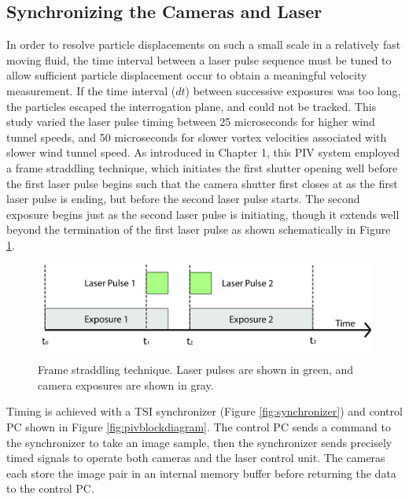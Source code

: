 \subsection{Synchronizing the Cameras and Laser}
In order to resolve particle displacements on such a small scale in a 
relatively fast moving fluid, the time interval between a laser pulse sequence 
must be tuned to allow sufficient particle displacement occur to obtain a 
meaningful velocity measurement. If the time interval ($dt$) between successive 
exposures was too long, the particles escaped the interrogation plane, and 
could not be tracked. This study varied the laser pulse timing 
between 25 microseconds for higher wind tunnel speeds, and 50 microseconds for 
slower vortex velocities associated with slower wind tunnel speed. As 
introduced in Chapter 1, this PIV system employed a frame straddling technique, 
which initiates the first shutter opening well before the first laser 
pulse begins such that the camera shutter first closes at as the first laser 
pulse is ending, but before the second laser pulse starts. The second exposure 
begins just as the second laser pulse is initiating, though it extends well 
beyond the termination of the first laser pulse as shown schematically in 
Figure \ref{fig:frame_straddling}. 

\vspace{32pt}
\begin{figure}
	\centering
	\includegraphics[width=5.5in]{figs/piv_method/frame_straddling}
	\caption{Frame straddling technique. Laser pulses are shown in green, and 
		camera exposures are shown in gray.}
	\label{fig:frame_straddling}
\end{figure}

Timing is achieved with a TSI synchronizer (Figure \ref{fig:synchronizer}) and 
control PC shown in Figure 
\ref{fig:pivblockdiagram}. The control PC sends a command to the synchronizer 
to take an image sample, then the synchronizer sends precisely timed signals to 
operate both cameras and the laser control unit. The cameras each store the 
image pair in an internal memory buffer before returning the data to the 
control PC.

